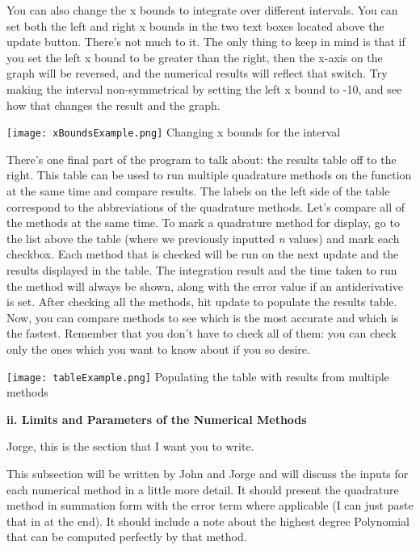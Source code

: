 \documentclass[12pt]{article}
\newcommand{\newLine}{\vspace{5mm}}
\newcommand{\nextsubsection}[1]{\newLine \noindent \large \textbf{#1} \normalsize}
\begin{document}
\newLine You can also change the x bounds to integrate over different intervals. You can set both the left and right x bounds in the two text boxes located above the update button. There's not much to it. The only thing to keep in mind is that if you set the left x bound to be greater than the right, then the x-axis on the graph will be reversed, and the numerical results will reflect that switch. Try making the interval non-symmetrical by setting the left x bound to -10, and see how that changes the result and the graph.

\begin{center}
\texttt{[image: xBoundsExample.png]}
\small Changing x bounds for the interval
\normalsize
\end{center}

\newLine There's one final part of the program to talk about: the results table off to the right. This table can be used to run multiple quadrature methods on the function at the same time and compare results. The labels on the left side of the table correspond to the abbreviations of the quadrature methods. Let's compare all of the methods at the same time. To mark a quadrature method for display, go to the list above the table (where we previously inputted \emph{n} values) and mark each checkbox. Each method that is checked will be run on the next update and the results displayed in the table. The integration result and the time taken to run the method will always be shown, along with the error value if an antiderivative is set. After checking all the methods, hit update to populate the results table. Now, you can compare methods to see which is the most accurate and which is the fastest. Remember that you don't have to check all of them: you can check only the ones which you want to know about if you so desire.

\begin{center}
\texttt{[image: tableExample.png]}
\small Populating the table with results from multiple methods
\normalsize
\end{center}

\nextsubsection{ii. Limits and Parameters of the Numerical Methods}

\newLine  Jorge, this is the section that I want you to write.

This subsection will be written by John and Jorge and will discuss the inputs for each numerical method in a little more detail. It should present the quadrature method in summation form with the error term where applicable (I can just paste that in at the end). It should include a note about the highest degree Polynomial that can be computed perfectly by that method. 
\end{document}
